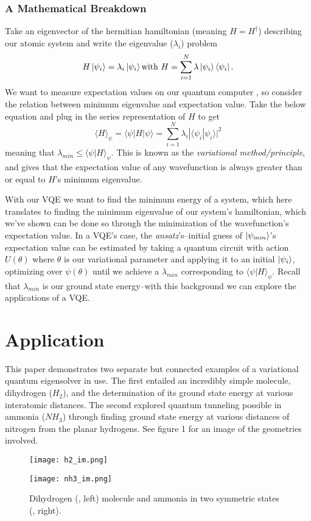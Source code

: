 \documentclass[10pt,twocolumn,letterpaper]{article}
\begin{document}
\subsubsection{A Mathematical Breakdown}
Take an eigenvector of the hermitian hamiltonian (meaning $H = H^\dagger$) describing our atomic system and write the eigenvalue ($\lambda_i$) problem 
$$H\ket{\psi_i}=\lambda_i\ket{\psi_i} \text{with } H = \displaystyle \sum_{i=1}^N\lambda\ket{\psi_i}\bra{\psi_i}.$$
We want to measure expectation values on our quantum computer \cite{vqe}, so consider the relation between minimum eigenvalue and expectation value. Take the below equation and plug in the series representation of $H$ to get
$$\langle H \rangle_\psi = \langle \psi | H | \psi \rangle = \displaystyle \sum_{i=1}^N \lambda_i | \langle \psi_i | \psi_i \rangle|^2 $$ meaning that $\lambda_{min} \leq \langle \psi | H \rangle_\psi$. This is known as the \textit{variational method/principle}, and gives that the expectation value of any wavefunction is always greater than or equal to $H$'s minimum eigenvalue.

With our VQE we want to find the minimum energy of a system, which here translates to finding the minimum eigenvalue of our system's hamiltonian, which we've shown can be done so through the minimization of the wavefunction's expectation value. In a VQE's case, the \textit{ansatz}'s--initial guess of $\ket{\psi_{min}}$'s expectation value can be estimated by taking a quantum circuit with action $U(\theta)$ where $\theta$ is our variational parameter and applying it to an initial $\ket{\psi_i}$, optimizing over $\psi(\theta)$ until we achieve a $\lambda_{min}$ corresponding to $\langle \psi | H \rangle_\psi$. Recall that $\lambda_{min}$ is our ground state energy--with this background we can explore the applications of a VQE.
\section{Application}
This paper demonstrates two separate but connected examples of a variational quantum eigensolver in use. The first entailed an incredibly simple molecule, dihydrogen ($H_2$), and the determination of its ground state energy at various interatomic distances. The second explored quantum tunneling possible in ammonia ($NH_3$) through finding ground state energy at various distances of nitrogen from the planar hydrogens. See figure 1 for an image of the geometries involved. 
\begin{figure}[h]
    \begin{minipage}{0.3\textwidth}
        \texttt{[image: h2\_im.png]}
        \label{1}
    \end{minipage}
    \hfill
    \begin{minipage}{0.5\textwidth}
        \texttt{[image: nh3\_im.png]}
    \end{minipage}
    \caption{Dihydrogen (\cite{h2}, left) molecule and ammonia in two symmetric states (\cite{nh3_mol}, right).}
\end{figure}
\end{document}
